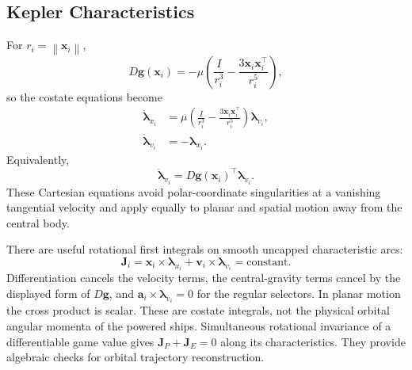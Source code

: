 \documentclass[journal,a4paper]{IEEEtran}
\newcommand{\norm}[1]{\left\|#1\right\|}
\begin{document}
\subsection{Kepler Characteristics}
For $r_i=\norm{\mathbf x_i}$,
\begin{equation}
 D\mathbf g(\mathbf x_i)
 =-\mu\left(\frac{I}{r_i^3}
             -\frac{3\mathbf x_i\mathbf x_i^\top}{r_i^5}\right),
\end{equation}
so the costate equations become
\begin{align}
 \dot{\boldsymbol\lambda}_{x_i}
 &=\mu\left(\frac{I}{r_i^3}
             -\frac{3\mathbf x_i\mathbf x_i^\top}{r_i^5}\right)
                       \boldsymbol\lambda_{v_i},\label{eq:keplercostate}\\
 \dot{\boldsymbol\lambda}_{v_i}&=-\boldsymbol\lambda_{x_i}.
\end{align}
Equivalently,
\begin{equation}
 \ddot{\boldsymbol\lambda}_{v_i}
             =D\mathbf g(\mathbf x_i)^\top\boldsymbol\lambda_{v_i}.
\end{equation}
These Cartesian equations avoid polar-coordinate singularities at a vanishing tangential velocity and apply equally to planar and spatial motion away from the central body.

There are useful rotational first integrals on smooth uncapped characteristic arcs:
\begin{equation}
 \mathbf J_i=\mathbf x_i\mathbin{\times}\boldsymbol\lambda_{x_i}
             +\mathbf v_i\mathbin{\times}\boldsymbol\lambda_{v_i}
             =\text{constant}.
 \label{eq:costateangular}
\end{equation}
Differentiation cancels the velocity terms, the central-gravity terms cancel by the displayed form of $D\mathbf g$, and $\mathbf a_i\times\boldsymbol\lambda_{v_i}=0$ for the regular selectors. In planar motion the cross product is scalar. These are costate integrals, not the physical orbital angular momenta of the powered ships. Simultaneous rotational invariance of a differentiable game value gives $\mathbf J_P+\mathbf J_E=0$ along its characteristics. They provide algebraic checks for orbital trajectory reconstruction.
\end{document}
